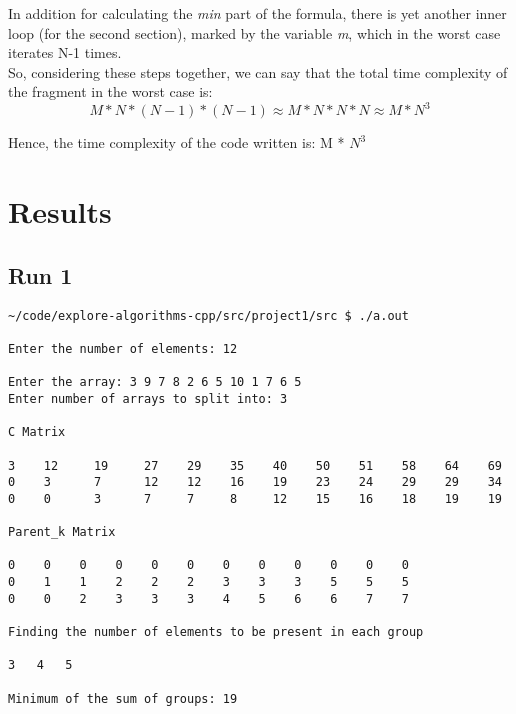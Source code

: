 \documentclass{article}
\begin{document}
In addition for calculating the \textit{min} part of the formula, there is yet another inner loop (for the second section),
marked by the variable \textit{m}, which in the worst case iterates N-1 times. \\

So, considering these steps together, we can say that the total time complexity of the fragment in the worst case is:
\[
  M * N * (N-1) * (N-1) \approx M * N * N * N  \approx M * N^{3}
\]

Hence, the time complexity of the code written is: M * $N^{3}$

\section{Results}

\subsection{Run 1}

\begin{verbatim}
~/code/explore-algorithms-cpp/src/project1/src $ ./a.out 

Enter the number of elements: 12

Enter the array: 3 9 7 8 2 6 5 10 1 7 6 5
Enter number of arrays to split into: 3

C Matrix

3    12     19     27    29    35    40    50    51    58    64    69
0    3      7      12    12    16    19    23    24    29    29    34    
0    0      3      7     7     8     12    15    16    18    19    19

Parent_k Matrix

0    0    0    0    0    0    0    0    0    0    0    0    
0    1    1    2    2    2    3    3    3    5    5    5    
0    0    2    3    3    3    4    5    6    6    7    7    

Finding the number of elements to be present in each group

3	4	5	

Minimum of the sum of groups: 19
\end{verbatim}
\end{document}
